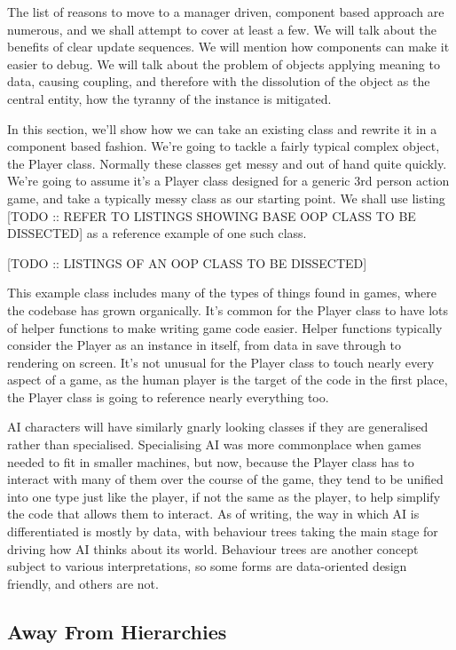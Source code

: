 \documentclass[a4paper,12pt]{article}
\begin{document}
The list of reasons to move to a manager driven, component based approach are numerous, and we shall attempt to cover at least a few.
We will talk about the benefits of clear update sequences.
We will mention how components can make it easier to debug.
We will talk about the problem of objects applying meaning to data, causing coupling, and therefore with the dissolution of the object as the central entity, how the tyranny of the instance is mitigated.

In this section, we'll show how we can take an existing class and rewrite it in a component based fashion.
We're going to tackle a fairly typical complex object, the Player class.
Normally these classes get messy and out of hand quite quickly.
We're going to assume it's a Player class designed for a generic 3rd person action game, and take a typically messy class as our starting point.
We shall use listing [TODO :: REFER TO LISTINGS SHOWING BASE OOP CLASS TO BE DISSECTED] as a reference example of one such class.

[TODO :: LISTINGS OF AN OOP CLASS TO BE DISSECTED]

This example class includes many of the types of things found in games, where the codebase has grown organically.
It's common for the Player class to have lots of helper functions to make writing game code easier.
Helper functions typically consider the Player as an instance in itself, from data in save through to rendering on screen.
It's not unusual for the Player class to touch nearly every aspect of a game, as the human player is the target of the code in the first place, the Player class is going to reference nearly everything too.

AI characters will have similarly gnarly looking classes if they are generalised rather than specialised.
Specialising AI was more commonplace when games needed to fit in smaller machines, but now, because the Player class has to interact with many of them over the course of the game, they tend to be unified into one type just like the player, if not the same as the player, to help simplify the code that allows them to interact.
As of writing, the way in which AI is differentiated is mostly by data, with behaviour trees taking the main stage for driving how AI thinks about its world.
Behaviour trees are another concept subject to various interpretations, so some forms are data-oriented design friendly, and others are not.

\subsection{Away From Hierarchies}
\end{document}
